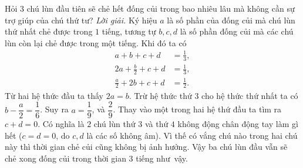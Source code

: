 \begin{multicols}{2}
\begin{figure}[H]
	\end{figure}
	Hỏi $3$ chú lùn đầu tiên sẽ chẻ hết đống củi trong bao nhiêu lâu mà không cần sự trợ giúp của chú thứ tư?
	\vskip 0.1cm
	\textit{Lời giải.} 	Ký hiệu $a$ là số phần của đống củi mà chú lùn thứ nhất chẻ được trong $1$ tiếng, tương tự $b, c,d$ là số phần đống củi mà các chú lùn còn lại chẻ được trong một tiếng. Khi đó ta có
	\begin{align*}
		a+b+c+d      &= \frac{1}{3},\\
		2a+\frac{b}{2}+c+d    &= \frac{1}{3},\\
		\frac{a}{2}+2b+c+d    &= \frac{1}{2}.
	\end{align*}
	Từ hai hệ thức đầu ta thấy $2a=b$.
	\vskip 0.1cm
	Trừ hệ thức thứ $3$ cho hệ thức thứ nhất ta có $b-\dfrac{a}{2}=\dfrac{1}{6}$.
	\vskip 0.1cm
	Suy ra $a= \dfrac{1}{9}$, và $\dfrac{2}{9}$. Thay vào một trong hai hệ thứ đầu ta tìm ra $c+d=0$. Có nghĩa là $2$ chú lùn thứ $3$ và thứ $4$ không động chân động tay làm gì hết ($c=d=0$, do $c,d$ là các số không âm).
	Vì thế có vắng chú nào trong hai chú này thì thời gian chẻ củi cũng không bị ảnh hưởng. Vậy ba chú lùn đầu vẫn sẽ  chẻ xong đống củi trong thời gian $3$ tiếng như~vậy.
\end{multicols}
\newpage
\begingroup
{} 
\centering
\endgroup
\graphicspath{{../toancuabi/pic/}}
\vspace*{25pt}

